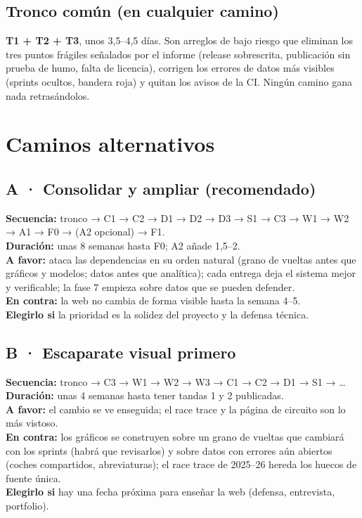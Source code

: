 \documentclass[11pt,openany]{report}
\begin{document}
\subsection{Tronco común (en cualquier camino)}\label{sec:tronco}

\textbf{T1 + T2 + T3}, unos 3,5–4,5 días. Son arreglos de bajo riesgo que eliminan los tres puntos
frágiles señalados por el informe (release sobrescrita, publicación sin prueba de humo, falta de
licencia), corrigen los errores de datos más visibles (sprints ocultos, bandera roja) y quitan los
avisos de la CI. Ningún camino gana nada retrasándolos.

\section{Caminos alternativos}\label{sec:caminos}

\subsection*{A · Consolidar y ampliar (recomendado)}
\textbf{Secuencia:} tronco → C1 → C2 → D1 → D2 → D3 → S1 → C3 → W1 → W2 → A1 → F0 → (A2 opcional) → F1.\\
\textbf{Duración:} unas 8 semanas hasta F0; A2 añade 1,5–2.\\
\textbf{A favor:} ataca las dependencias en su orden natural (grano de vueltas antes que gráficos y
modelos; datos antes que analítica); cada entrega deja el sistema mejor y verificable; la fase 7
empieza sobre datos que se pueden defender.\\
\textbf{En contra:} la web no cambia de forma visible hasta la semana 4–5.\\
\textbf{Elegirlo si} la prioridad es la solidez del proyecto y la defensa técnica.

\subsection*{B · Escaparate visual primero}
\textbf{Secuencia:} tronco → C3 → W1 → W2 → W3 → C1 → C2 → D1 → S1 → \ldots\\
\textbf{Duración:} unas 4 semanas hasta tener tandas 1 y 2 publicadas.\\
\textbf{A favor:} el cambio se ve enseguida; el race trace y la página de circuito son lo más
vistoso.\\
\textbf{En contra:} los gráficos se construyen sobre un grano de vueltas que cambiará con los
sprints (habrá que revisarlos) y sobre datos con errores aún abiertos (coches compartidos,
abreviaturas); el race trace de 2025–26 hereda los huecos de fuente única.\\
\textbf{Elegirlo si} hay una fecha próxima para enseñar la web (defensa, entrevista, portfolio).
\end{document}
